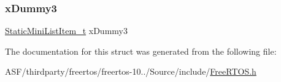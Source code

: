 \mbox{\label{structx_s_t_a_t_i_c___l_i_s_t_a22f81ad5d2e6efe9c850330af339ac02}} 
\subsubsection{\texorpdfstring{xDummy3}{xDummy3}}
{\footnotesize\ttfamily \mbox{\hyperlink{_free_r_t_o_s_8h_a9097f48f4dfa56e8e01d9179462c7994}{Static\+Mini\+List\+Item\+\_\+t}} x\+Dummy3}



The documentation for this struct was generated from the following file\+:\begin{DoxyCompactItemize}
\item 
A\+S\+F/thirdparty/freertos/freertos-\/10../\+Source/include/\mbox{\hyperlink{_free_r_t_o_s_8h}{Free\+R\+T\+O\+S.\+h}}\end{DoxyCompactItemize}
